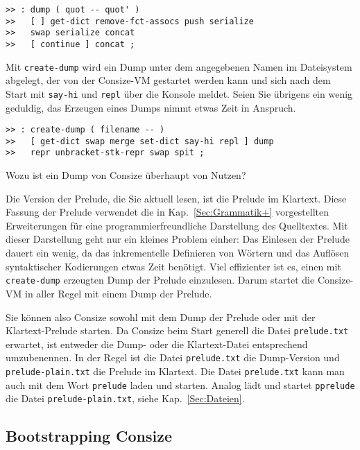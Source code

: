 
\begin{verbatim}
>> : dump ( quot -- quot' )
>>   [ ] get-dict remove-fct-assocs push serialize
>>   swap serialize concat
>>   [ continue ] concat ;
\end{verbatim}

Mit \verb|create-dump| wird ein Dump unter dem angegebenen Namen im Dateisystem abgelegt, der von der Consize-VM gestartet werden kann und sich nach dem Start mit \verb|say-hi| und \verb|repl| über die Konsole meldet. Seien Sie übrigens ein wenig geduldig, das Erzeugen eines Dumps nimmt etwas Zeit in Anspruch.

\begin{verbatim}    
>> : create-dump ( filename -- )
>>   [ get-dict swap merge set-dict say-hi repl ] dump
>>   repr unbracket-stk-repr swap spit ;
\end{verbatim}

Wozu ist ein Dump von Consize überhaupt von Nutzen?

Die Version der Prelude, die Sie aktuell lesen, ist die Prelude im Klartext. Diese Fassung der Prelude verwendet die in Kap.~\ref{Sec:Grammatik+} vorgestellten Erweiterungen für eine programmierfreundliche Darstellung des Quelltextes. Mit dieser Darstellung geht nur ein kleines Problem einher: Das Einlesen der Prelude dauert ein wenig, da das inkrementelle Definieren von Wörtern und das Auflösen syntaktischer Kodierungen etwas Zeit benötigt. Viel effizienter ist es, einen mit \verb|create-dump| erzeugten Dump der Prelude einzulesen. Darum startet die Consize-VM in aller Regel mit einem Dump der Prelude.

Sie können also Consize sowohl mit dem Dump der Prelude oder mit der Klartext-Prelude starten. Da Consize beim Start generell die Datei \verb|prelude.txt| erwartet, ist entweder die Dump- oder die Klartext-Datei entsprechend umzubenennen. In der Regel ist die Datei \verb|prelude.txt| die Dump-Version und \verb|prelude-plain.txt| die Prelude im Klartext. Die Datei \verb|prelude.txt| kann man auch mit dem Wort \verb|prelude| laden und starten. Analog lädt und startet \verb|pprelude| die Datei \verb|prelude-plain.txt|, siehe Kap.~\ref{Sec:Dateien}.

\subsection{Bootstrapping Consize}
\label{Sec:Bootstrapping}


